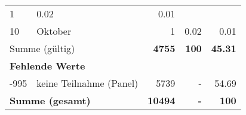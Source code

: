 \begin{longtable}{lXrrr}
       \num{1} &
       \num[round-mode=places,round-precision=2]{0,02} &
         \num[round-mode=places,round-precision=2]{0,01} \\

     10 &
     \multicolumn{1}{X}{ Oktober   } &


       \num{1} &
       \num[round-mode=places,round-precision=2]{0,02} &
         \num[round-mode=places,round-precision=2]{0,01} \\
     \midrule
     \multicolumn{2}{l}{Summe (gültig)} &
       \textbf{\num{4755}} &
     \textbf{100} &
       \textbf{\num[round-mode=places,round-precision=2]{45,31}} \\
     \multicolumn{5}{l}{\textbf{Fehlende Werte}}\\
       -995 &
       keine Teilnahme (Panel) &
         \num{5739} &
        - &
         \num[round-mode=places,round-precision=2]{54,69} \\
     \midrule
     \multicolumn{2}{l}{\textbf{Summe (gesamt)}} &
          \textbf{\num{10494}} &
        \textbf{-} &
        \textbf{100} \\
     \bottomrule
     \end{longtable}
     
